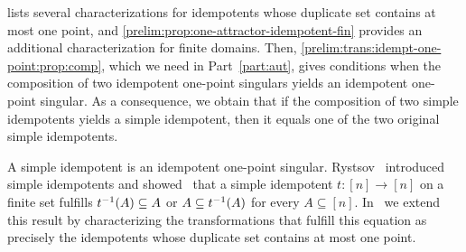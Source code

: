 
 lists several characterizations for idempotents
whose duplicate set contains at most one point,
and \cref{prelim:prop:one-attractor-idempotent-fin} 
provides an additional characterization for finite domains.
Then, \cref{prelim:trans:idempt-one-point:prop:comp}, which we need in Part~\ref{part:aut},
gives conditions when the composition of two idempotent one-point singulars
yields an idempotent one-point singular. As a consequence, we obtain
that if the composition of two simple idempotents yields a simple idempotent,
then it equals one of the two original simple idempotents.

A simple idempotent is an idempotent one-point singular.
Rystsov~\cite{Rystsov2000} introduced simple idempotents
and showed~\cite[Lem.~1]{Rystsov2000} that a simple idempotent $t \colon [n] \to [n]$
on a finite set fulfills $\applyfunc{A}{t^{-1}} \subseteq A$
or $A \subseteq \applyfunc{A}{t^{-1}}$ for every $A \subseteq [n]$.
In~ 
we extend this result by characterizing the transformations that fulfill 
this equation as precisely the idempotents whose
duplicate set contains at most one point.


